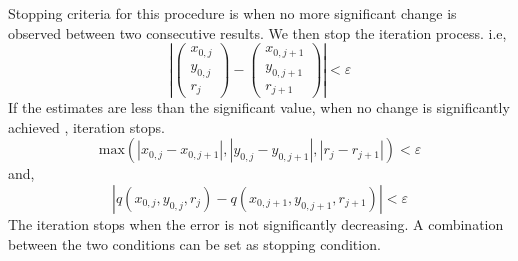 \noindent Stopping criteria for this procedure is when no more significant change is observed between two consecutive results. We then stop the iteration process. i.e,
$$ \left|
\begin{pmatrix}
x_{0,j}\\
y_{0,j}\\
r_j
\end{pmatrix} -
\begin{pmatrix}
x_{0,j+1}\\
y_{0,j+1}\\
r_{j+1}
\end{pmatrix}
\right| < \varepsilon$$
\noindent If the estimates are less than the significant value, when no change is significantly achieved , iteration stops.
$$\text{max}\left(\left| x_{0,j} - x_{0,j+1} \right|, \left| y_{0,j} - y_{0,j+1} \right|, \left| r_{j} - r_{j+1} \right| \right) < \varepsilon$$
\noindent and,
$$\left| q(x_{0,j}, y_{0,j}, r_j) - q(x_{0,j+1}, y_{0,j+1}, r_{j+1}) \right| < \varepsilon$$
\noindent The iteration stops when the error is not significantly decreasing. A combination between the two conditions can be set as stopping condition.




